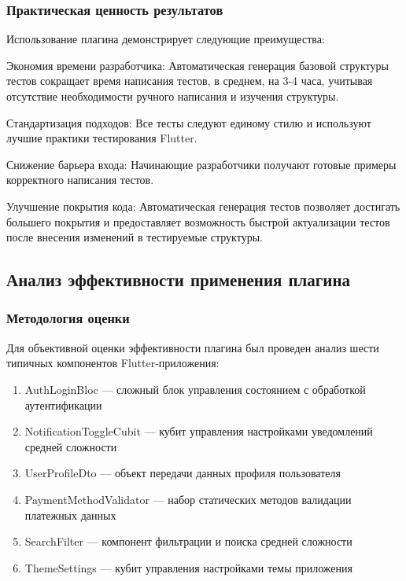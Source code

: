 \documentclass[14pt, russian]{scrartcl}
\begin{document}
\subsubsection{Практическая ценность результатов}

Использование плагина демонстрирует следующие преимущества:

\begin{itemize*}
    \item Экономия времени разработчика: Автоматическая генерация базовой структуры тестов сокращает время написания тестов, в среднем, на 3-4 часа, учитывая отсутствие необходимости ручного написания и изучения структуры.
    \item Стандартизация подходов: Все тесты следуют единому стилю и используют лучшие практики тестирования Flutter.
    \item Снижение барьера входа: Начинающие разработчики получают готовые примеры корректного написания тестов.
    \item Улучшение покрытия кода: Автоматическая генерация тестов позволяет достигать большего покрытия и предоставляет возможность быстрой актуализации тестов после внесения изменений в тестируемые структуры.
\end{itemize*}

\subsection{Анализ эффективности применения плагина}


\subsubsection{Методология оценки}

Для объективной оценки эффективности плагина был проведен анализ шести типичных компонентов Flutter-приложения:

\begin{enumerate}
    \item AuthLoginBloc — сложный блок управления состоянием с обработкой аутентификации
    \item NotificationToggleCubit — кубит управления настройками уведомлений средней сложности
    \item UserProfileDto — объект передачи данных профиля пользователя
    \item PaymentMethodValidator — набор статических методов валидации платежных данных
    \item SearchFilter — компонент фильтрации и поиска средней сложности
    \item ThemeSettings — кубит управления настройками темы приложения
\end{enumerate}
\end{document}
